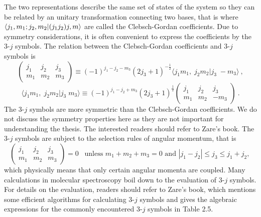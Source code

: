 The two representations describe the same set of states of the system so they can be related by an unitary
transformation connecting two bases, that is
where $\langle j_1, m_1; j_2, m_2 | (j_1 j_2)j, m \rangle$ are called the Clebsch-Gordan coefficients. Due to symmetry 
considerations, it is often convenient to express the coefficients by the 3-$j$ symbols. The relation between the Clebsch-Gordan 
coefficients and 3-$j$ symbols is\cite{zare-book}
\begin{equation}
\left( 
\begin{array}{ ccc }
j_{1} & j_{2} & j_{3} \\
m_{1} & m_{2} & m_{3}
\end{array}
\right) \equiv (-1)^{j_{1} - j_{2} - m_{3}} (2j_{3} +1)^{-\frac{1}{2}} \langle j_{1}m_{1}, \; j_{2} m_{2} | j_{3}\; -m_{3}\rangle \ ,
\end{equation}
\begin{equation}
 \langle j_{1}m_{1}, \; j_{2} m_{2} | j_{3}\; m_{3}\rangle \equiv (-1)^{j_{1} - j_{2} + m_{3}} (2j_{3} +1)^{\frac{1}{2}}
\left( 
\begin{array}{ ccc }
j_{1} & j_{2} & j_{3} \\
m_{1} & m_{2} & -m_{3}
\end{array}
\right)  \ . \label{CG-3j}
\end{equation}
The 3-$j$ symbols are more symmetric than the Clebsch-Gordan coefficients. We do not discuss the symmetry properties here as they are not important for understanding the thesis. The interested readers should refer to Zare's book\cite{zare-book}.  The 3-$j$ symbols are subject to the selection rules of angular momentum, that is
\begin{equation}
\left(
\begin{array}{ccc}
j_{1}&j_{2}&j_{3} \\
m_{1}&m_{2}&m_{3}
\end{array}
\right)
=0 \;\;\; \mbox{unless $m_{1} + m_{2} + m_{3} = 0$ and $|j_1 - j_2| \leq j_3 \leq j_1 + j_2$, } \nonumber 
\end{equation}
which physically means that only certain angular momenta are coupled. Many calculations in molecular spectroscopy boil
down to the evaluation of 3-$j$ symbols. For details on the evaluation, readers should refer to Zare's book\cite{zare-book}, which mentions some efficient algorithms for calculating 3-$j$ 
symbols and gives the algebraic expressions for the commonly encountered 3-$j$ symbols in Table 2.5. 
 

